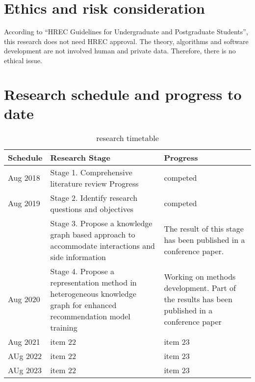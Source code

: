 \section{Ethics and risk consideration}
According to “HREC Guidelines for Undergraduate and Postgraduate Students”, this research does not need HREC approval. The theory, algorithms and software development are not involved human and private data. Therefore, there is no ethical issue.

\section{Research schedule and progress to date}

\begin{table}[h!]
\caption{research timetable}
    \begin{tabular}{ |p{2cm}|p{6cm}|p{4cm}|}
     \hline
        Schedule & Research Stage & Progress \\
     \hline
        Aug 2018  & Stage 1. Comprehensive literature review Progress  & competed  \\
        \hline
        Aug 2019  & Stage 2. Identify research questions and objectives  & competed  \\
                  & Stage 3. Propose a knowledge graph based approach to accommodate interactions and side information & The result of this stage has been published in a conference paper. \\
        \hline
        Aug 2020  & Stage 4. Propose a representation method in heterogeneous knowledge graph for enhanced recommendation model training & Working on methods development. Part of the results has been published in a conference paper \\
        \hline
        Aug 2021  & item 22  & item 23  \\
        \hline
        AUg 2022 & item 22  & item 23  \\
        \hline
        AUg 2023 & item 22  & item 23  \\
      \hline
     \end{tabular}
\end{table}